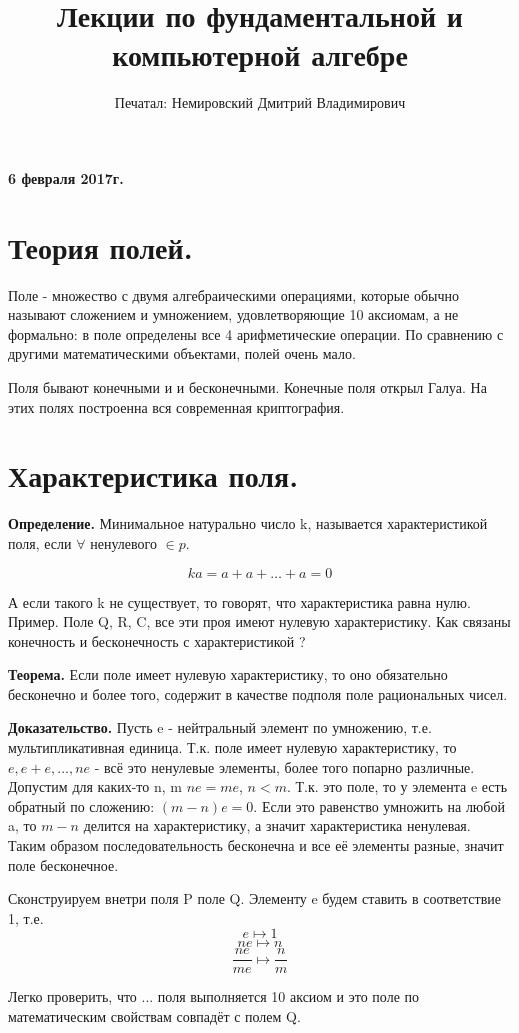 \documentclass{article}
\title{Лекции по фундаментальной и компьютерной алгебре}
\author{Печатал: Немировский Дмитрий Владимирович}
\begin{document}
\maketitle
\textbf {6 февраля 2017г.}
\section*{Теория полей.}
Поле - множество с двумя алгебраическими операциями, которые обычно называют сложением и умножением, удовлетворяющие 10 аксиомам, а не формально: в поле определены все 4 арифметические операции. По сравнению с другими математическими объектами, полей очень мало.

Поля бывают конечными и и бесконечными. Конечные поля открыл Галуа. На этих полях построенна вся современная криптография.

\section*{Характеристика поля.}
{\bf Определение.} Минимальное натурально число k, называется характеристикой поля, если $\forall$ ненулевого $\in p$. 

$$ka=a+a+\ldots+a=0$$

А если такого k не существует, то говорят, что характеристика равна нулю. Пример. Поле Q, R, C, все эти проя имеют нулевую характеристику.
Как связаны конечность и бесконечность с характеристикой ?

{\bf Теорема.} Если поле имеет нулевую характеристику, то оно обязательно бесконечно и более того, содержит в качестве подполя поле рациональных чисел.

{\bf Доказательство.} Пусть e - нейтральный элемент по умножению, т.е. мультипликативная единица. Т.к. поле имеет нулевую характеристику, то $e,e+e,\ldots,ne$ - всё это ненулевые элементы, более того попарно различные. Допустим для каких-то n, m $ne=me$, $n<m$. Т.к. это поле, то у элемента e есть обратный по сложению: $(m-n)e=0$. Если это равенство умножить на любой a, то $m-n$ делится на характеристику, а значит характеристика ненулевая. Таким образом последовательность бесконечна и  все её элементы разные, значит поле бесконечное.

Сконструируем внетри поля P поле Q. Элементу e будем ставить в соответствие 1, т.е. $$e\mapsto1$$ $$ne\mapsto n$$ $$\frac{ne}{me}\mapsto\frac{n}{m}$$

Легко проверить, что ... поля выполняется 10 аксиом и это поле по математическим свойствам совпадёт с полем Q.
\end{document}
